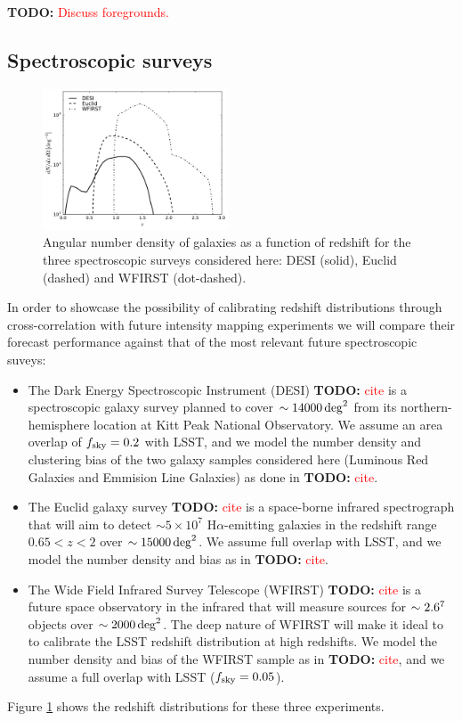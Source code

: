 \documentclass[prd,twocolumn]{revtex4}
\newcommand{\TODO}[1]{{\bf TODO:} \textcolor{red}{#1}}
\begin{document}
    
    \TODO{Discuss foregrounds.}
 
  \subsection{Spectroscopic surveys}\label{ssec:method.spec}
    \begin{figure}
      \centering
      \includegraphics[width=0.49\textwidth]{nz_spec}
      \caption{Angular number density of galaxies as a function of redshift for the three
               spectroscopic surveys considered here: DESI (solid), Euclid (dashed) and
               WFIRST (dot-dashed).}
      \label{fig:nz_spec}
    \end{figure}
    In order to showcase the possibility of calibrating redshift distributions through
    cross-correlation with future intensity mapping experiments we will compare their
    forecast performance against that of the most relevant future spectroscopic suveys:
    \begin{itemize}
      \item The Dark Energy Spectroscopic Instrument (DESI) \TODO{cite} is a spectroscopic galaxy
            survey planned to cover $\sim14000\,{\rm deg}^2$ from its northern-hemisphere
            location at Kitt Peak National Observatory. We assume an area overlap of
            $f_{\rm sky}=0.2$ with LSST, and we model the number density and clustering bias
            of the two galaxy samples considered here (Luminous Red Galaxies and Emmision Line
            Galaxies) as done in \TODO{cite}.
      \item The Euclid galaxy survey \TODO{cite} is a space-borne infrared spectrograph that
            will aim to detect $\sim5\times10^7$ H$\alpha$-emitting galaxies in the redshift
            range $0.65<z<2$ over $\sim15000\,{\rm deg}^2$. We assume full overlap with LSST,
            and we model the number density and bias as in \TODO{cite}.
      \item The Wide Field Infrared Survey Telescope (WFIRST) \TODO{cite} is a future space
            observatory in the infrared that will measure sources for $\sim2.6\time10^7$ objects
            over $\sim2000\,{\rm deg}^2$. The deep nature of WFIRST will make it ideal to
            to calibrate the LSST redshift distribution at high redshifts. We model the number
            density and bias of the WFIRST sample as in \TODO{cite}, and we assume a full
            overlap with LSST ($f_{\rm sky}=0.05$).
    \end{itemize}
    Figure \ref{fig:nz_spec} shows the redshift distributions for these three experiments.
 
\end{document}

